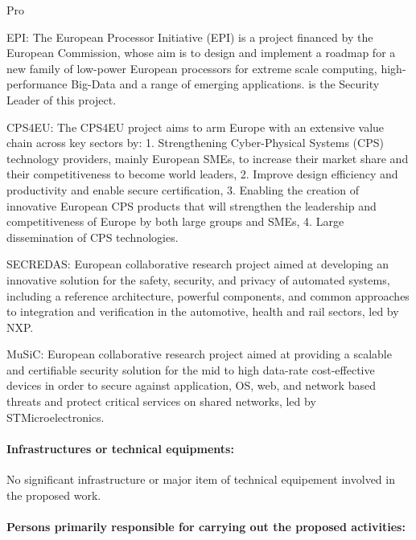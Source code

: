 \begin{sitedescription}{Pro}
\begin{compactitem}
\item EPI: The European Processor Initiative (EPI) is a project
  financed by the European Commission, whose aim is to design and
  implement a roadmap for a new family of low-power European
  processors for extreme scale computing, high-performance Big-Data
  and a range of emerging applications. \provenrun{} is the Security
  Leader of this project.
\item CPS4EU: The CPS4EU project aims to arm Europe with an extensive
  value chain across key sectors by: 1. Strengthening Cyber-Physical
  Systems (CPS) technology providers, mainly European SMEs, to
  increase their market share and their competitiveness to become
  world leaders, 2. Improve design efficiency and productivity and
  enable secure certification, 3. Enabling the creation of innovative
  European CPS products that will strengthen the leadership and
  competitiveness of Europe by both large groups and SMEs, 4. Large
  dissemination of CPS technologies.
\item SECREDAS: European collaborative research project aimed at
  developing an innovative solution for the safety, security, and
  privacy of automated systems, including a reference architecture,
  powerful components, and common approaches to integration and
  verification in the automotive, health and rail sectors, led by
  NXP.
\item MuSiC: European collaborative research project aimed at
  providing a scalable and certifiable security solution for the mid
  to high data-rate cost-effective devices in order to secure against
  application, OS, web, and network based threats and protect critical
  services on shared networks, led by STMicroelectronics.
\end{compactitem}

\paragraph*{Infrastructures or technical equipments:}


No significant infrastructure or major item of technical equipement
involved in the proposed work.

\paragraph*{Persons primarily responsible for carrying out the proposed activities:}


\end{sitedescription}

